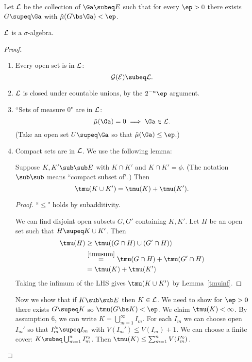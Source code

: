Let $\cal L$ be the collection of $\Ga\subeq E$ such that for every $\ep>0$ there exists $G\supeq \Ga$ with $\tilde{\mu}(G\bs \Ga)<\ep$.
\begin{thm}\label{lsigma}
$\cal L$ is a $\sigma$-algebra.
\end{thm}
\begin{proof}
\begin{enumerate}
\item Every open set is in $\cal L$:
\[\cal G(E)\subeq \cal L.\]
\item $\cal L$ is closed under countable unions, by the $2^{-n}\ep$ argument.
\item ``Sets of measure 0" are in $\cal L$:
\[\tilde{\mu}(\Ga)=0\implies \Ga\in \cal L.\]
(Take an open set $U\supeq \Ga$ so that $\tilde{\mu}(\Ga)\leq \ep$.)
\item Compact sets are in $\cal L$. We use the following lemma:
\begin{lem}
Suppose $K,K'\sub\sub E$ with $K\cap K'$ and $K\cap K'=\phi$. (The notation $\sub\sub$ means ``compact subset of".) Then
\[
\tmu(K\cup K')=\tmu(K)+\tmu(K').
\]
\end{lem}
\begin{proof}
``$\leq$" holds by subadditivity.

We can find disjoint open subsets $G,G'$ containing $K,K'$. Let $H$ be an open set such that $H\supeq K\cup K'$. Then
\begin{align*}
\tmu(H)&\geq
\tmu((G\cap H)\cup (G'\cap H))\\
&\stackrel{\ref{tmusum}}{=} \tmu(G\cap H)+\tmu(G'\cap H)\\
&=\tmu(K)+\tmu(K')
\end{align*}
Taking the infimum of the LHS gives $\tmu(K\cup K')$ by Lemma~\ref{tmuinf}.
\end{proof}
Now we show that if $K\sub\sub E$ then $K\in \cal L$.
We need to show for $\ep>0$ there exists $G\supeq K$ so $\tmu(G\bs K)<\ep$. We claim $\tmu(K)<\infty$. By assumption 6, we can write $K=\bigcup_{m=1}^{\infty} I_m$. For each $I_m$ we can choose open $I_m'$ so that $I_m'^{\circ}\supeq I_m$ with $V(I_m')\leq V(I_m)+1$. We can choose a finite cover: $K\subeq \bigcup_{m=1}^n I_m'^{\circ}$. Then $\tmu(K)\leq \sum_{m=1}^n V(I_m'^{\circ})$. %


\end{enumerate}
\end{proof}
